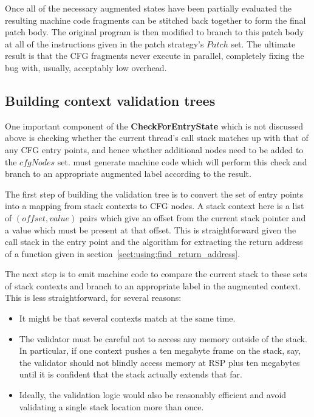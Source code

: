 Once all of the necessary augmented states have been partially
evaluated the resulting machine code fragments can be stitched back
together to form the final patch body.  The original program is then
modified to branch to this patch body at all of the instructions given
in the patch strategy's $Patch$ set.  The ultimate result is that the
CFG fragments never execute in parallel, completely fixing the bug
with, usually, acceptably low overhead.




\subsection{Building context validation trees}

One important component of the \textbf{CheckForEntryState} which is
not discussed above is checking whether the current thread's call
stack matches up with that of any CFG entry points, and hence whether
additional nodes need to be added to the $cfgNodes$ set.  {\Technique}
must generate machine code which will perform this check and branch to
an appropriate augmented label according to the result.

The first step of building the validation tree is to convert the set
of entry points into a mapping from stack contexts to CFG nodes.  A
stack context here is a list of $(offset, value)$ pairs which give an
offset from the current stack pointer and a value which must be
present at that offset.  This is straightforward given the call stack
in the entry point and the algorithm for extracting the return address
of a function given in section~\ref{sect:using:find_return_address}.

The next step is to emit machine code to compare the current stack to
these sets of stack contexts and branch to an appropriate label in the
augmented context.  This is less straightforward, for several reasons:

\begin{itemize}
\item
  It might be that several contexts match at the same time.
\item
  The validator must be careful not to access any memory outside of
  the stack.  In particular, if one context pushes a ten megabyte
  frame on the stack, say, the validator should not blindly access
  memory at RSP plus ten megabytes until it is confident that the
  stack actually extends that far.
\item
  Ideally, the validation logic would also be reasonably efficient and
  avoid validating a single stack location more than once.
\end{itemize}

